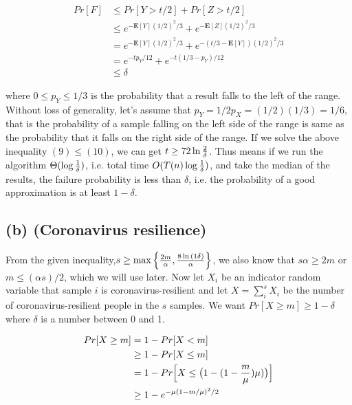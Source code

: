 \documentclass[11pt]{537homework}
\begin{document}
\begin{align}
  Pr[F]   & \leq Pr[Y > t/2] + Pr[Z > t/2] \\
          & \leq e^{-\mathbf{E}[Y](1/2)^2/3} + e^{-\mathbf{E}[Z](1/2)^2/3} \\
          & = e^{-\mathbf{E}[Y](1/2)^2/3} + e^{-(t/3 - \mathbf{E}[Y])(1/2)^2/3} \\
          & = e^{-tp_Y/12} + e^{-t(1/3-p_Y)/12} \\
          & \leq \delta 
\end{align}

where $0\leq p_Y \leq 1/3$ is the probability that a result falls to the left of the range. Without loss of generality, let's assume that $p_Y = 1/2 p_X = (1/2)(1/3) = 1/6$, that is the probability of a sample falling on the left side of the range is same as the probability that it falls on the right side of the range. If we solve the above inequality $(9) \leq (10)$, we can get $t \geq 72\ln{2 \over \delta}$. Thus means if we run the algorithm $\Theta(\log{1 \over \delta})$, i.e. total time $O(T(n)\log{1 \over \delta})$, and take the median of the results, the failure probability is less than $\delta$, i.e. the probability of a good approximation is at least $1-\delta$. 



\subsection*{(b) (\textbf{Coronavirus resilience})}

\proof From the given inequality,$s \geq \max{\Big\{{2m \over \alpha}}, {8 \ln{(1\delta)} \over \alpha} \Big\}$, we also know that $s\alpha \geq 2m$ or $m \leq (\alpha s)/2$, which we will use later. Now let $X_i$ be an indicator random variable that sample $i$ is coronavirus-resilient and let $X = \sum_{i}^s X_i$ be the number of coronavirus-resilient people in the $s$ samples. We want $Pr[X \geq m] \geq 1-\delta$ where $\delta$ is a number between 0 and 1. 

\begin{align}
  Pr[X \geq m]    & = 1 - Pr[X < m] \\
                  & \geq 1 - Pr[X \leq m] \\
                  & = 1 - Pr\Big[X \leq \big(1 - (1 - {m \over \mu})\mu) \big)\Big] \\
                  & \geq 1 - e^{-\mu (1-m/\mu)^2/2}
\end{align}
\end{document}
